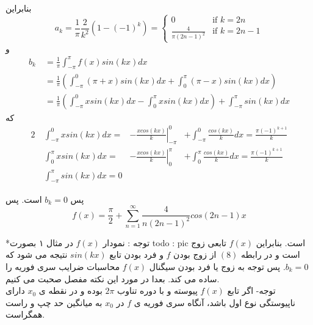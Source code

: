 \begin{example}
 بنابراین
 \[
 a_k=\frac{1}{\pi}\frac{2}{k^2}\left(1-(-1)^k\right)=
 \begin{cases}
 0 &\mbox{if } k=2n\\
 \frac{4}{\pi(2n-1)^2} &\mbox{if } k=2n-1
 \end{cases}
 \]
 و
\begin{equation*}
	\begin{aligned}
	b_k {} &\ = \frac{1}{\pi}\int_{-\pi}^{\pi}{f(x)sin(kx)dx}\\
	&\ = \frac{1}{\pi}\left(
	\int_{-\pi}^{0}{(\pi+x)sin(kx)dx}+\int_{0}^{\pi}{(\pi-x)sin(kx)dx}
	\right)\\
	&\ = \frac{1}{\pi}\left(\int_{-\pi}^{0}{xsin(kx)dx}-\int_{0}^{\pi}{xsin(kx)dx} \right)+\int_{-\pi}^{\pi}{sin(kx)dx}
	\end{aligned}
\end{equation*}
که
\begin{alignat*}{2}
{} &\ \int_{-\pi}^{0}{xsin(kx)dx}
	=&\left.{-\frac{xcos(kx)}{k}}\right |_{-\pi}^{0} 
	&+\int_{-\pi}^{0}{\frac{cos(kx)}{k}dx}=\frac{\pi(-1)^{k+1}}{k}\\
&\ \int_{0}^{\pi}{xsin(kx)dx}
	=&\left.{-\frac{xcos(kx)}{k}}\right |_{0}^{\pi} 
	&+\int_{0}^{\pi}{\frac{cos(kx)}{k}dx}=\frac{\pi(-1)^{k+1}}{k}\\
&\ \int_{-\pi}^{\pi}{sin(kx)dx}=0
\end{alignat*}

پس 
$b_k=0$
است. پس\\
\[f(x)=\frac{\pi}{2}+\sum_{n=1}^{\infty}{\frac{4}{n(2n-1)^2}}cos(2n-1)x\]

\end{example}
\hrulefill

*توجه : نمودار 
$f(x)$
در مثال ۱ بصورت 
todo : pic
است. بنابراین 
$f(x)$
تابعی زوج است و در رابطه 
$(8)$
از زوج بودن 
$f$
و فرد بودن تابع
$sin(kx)$
نتیجه می شود که 
$b_k=0$.
پس توجه به زوج یا فرد بودن سیگنال 
$f(x)$
محاسبات ضرایب سری فوریه را ساده می کند. بعدا در مورد این نکته مفصل صحبت می کنیم.\\
توجه- اگر تابع 
$f(x)$
پیوسته و با دوره تناوب 
$2\pi$
بوده و در نقطه ی 
$x_0$
دارای ناپیوستگی نوع اول باشد، آنگاه سری فوریه ی
$f$
در
$x_0$
به میانگین حد چپ و راست همگراست.\\

\hrulefill

